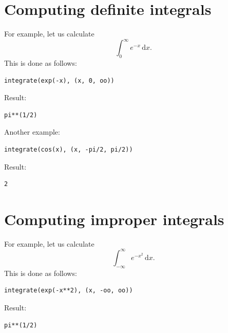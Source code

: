 \documentclass{article}
\begin{document}
\section{Computing definite integrals}

For example, let us calculate
$$
\int_0^{\infty} e^{-x}\, \mbox{d} x.
$$
This is done as follows:
\begin{verbatim}
integrate(exp(-x), (x, 0, oo))
\end{verbatim}
Result:
\begin{verbatim}
pi**(1/2)
\end{verbatim}
Another example:
\begin{verbatim}
integrate(cos(x), (x, -pi/2, pi/2))
\end{verbatim}
Result:
\begin{verbatim}
2
\end{verbatim}

\section{Computing improper integrals}

For example, let us calculate
$$
\int_{-\infty}^{\infty} e^{-x^2}\, \mbox{d} x.
$$
This is done as follows:
\begin{verbatim}
integrate(exp(-x**2), (x, -oo, oo))
\end{verbatim}
Result:
\begin{verbatim}
pi**(1/2)
\end{verbatim}
\end{document}
